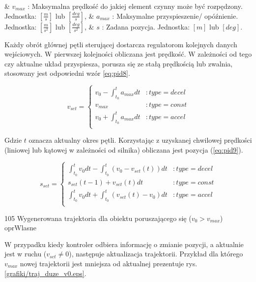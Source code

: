 \begin{easylist}
	& $ v_{max} $ : Maksymalna prędkość do jakiej element czynny może być rozpędzony. Jednostka: $[\frac{m}{s}] $ lub  $ [\frac{deg}{s}] $,
	& $ a_{max} $ : Maksymalne przyspieszenie/ opóźnienie. Jednostka: $[\frac{m}{s^2}] $ lub  $ [\frac{deg}{s^2}] $,
	& $ s $ : Zadana pozycja. Jednostka: $[m] $ lub  $ [deg] $.
	\\
\end{easylist}

Każdy obrót głównej pętli sterującej dostarcza regulatorom kolejnych danych wejściowych. W pierwszej kolejności obliczana jest prędkość. W zależności od tego czy aktualne układ przyspiesza, porusza się ze stałą prędkością lub zwalnia, stosowany jest odpowiedni wzór \ref{eq:pid8}.

\begin{equation} \label{eq:pid8}
	v_{set} =  \left\{
  \begin{array}{ll}
    v_0 - \int_{t_0}^{t} a_{max} dt & : type = decel \\
    v_{max} & : type = const \\
    v_0 + \int_{t_0}^{t} a_{max} dt & : type = accel \\
  \end{array}
\right.
\end{equation}

Gdzie $ t $ oznacza aktualny okres pętli. Korzystając z uzyskanej chwilowej prędkości (liniowej lub kątowej w zależności od silnika) obliczana jest pozycja (\ref{eq:pid9}).

\begin{equation} \label{eq:pid9}
	s_{set} =  \left\{
  \begin{array}{ll}
    \int_{t_0}^{t} v_0 dt - \int_{t_0}^{t} (v_0 - v_{set}(t)) dt & : type = decel \\
    s_{set}(t - 1) + v_{set}(t) dt & : type = const \\
    \int_{t_0}^{t} v_0 dt + \int_{t_0}^{t} (v_{set}(t) - v_0) dt & : type = accel \\
  \end{array}
\right.
\end{equation}

	{105}
	{Wygenerowana trajektoria dla obiektu poruszającego się ($ v_0 > v_{max} $)}
	{oprWlasne}

W przypadku kiedy kontroler odbiera informację o zmianie pozycji, a aktualnie jest w ruchu ($ v_{set} \neq 0$), następuje aktualizacja trajektorii. Przykład dla którego $ v_{max} $ nowej trajektorii jest mniejsza od aktualnej prezentuje rys. \ref{grafiki/traj_duze_v0.eps}. \\
	
